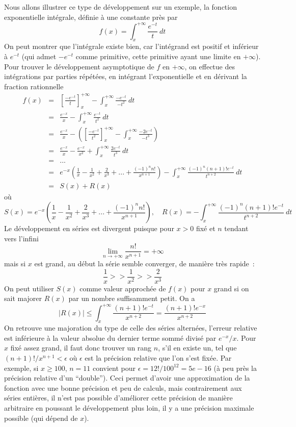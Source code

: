 \documentclass[a4paper,11pt]{article}
\begin{document}
Nous allons illustrer ce type de développement sur un exemple, la fonction 
exponentielle intégrale, définie à une constante près par
\[ f(x)=\int_x^{+\infty} \frac{e^{-t}}{t} \ dt \]
On peut montrer que l'intégrale existe bien, car l'intégrand est positif et inférieur à $e^{-t}$
(qui admet $-e^{-t}$ comme primitive, cette primitive ayant une limite en $+\infty$).
Pour trouver le développement asymptotique de $f$ en $+\infty$, on effectue des intégrations
par parties répétées, en intégrant l'exponentielle et en dérivant la fraction rationnelle
\begin{eqnarray*}
 f(x)&=&[\frac{-e^{-t}}{t}]_x^{+\infty} - \int_x^{+\infty} \frac{-e^{-t}}{-t^2} \ dt \\
&=& \frac{e^{-x}}{x} - \int_x^{+\infty} \frac{e^{-t}}{t^2} \ dt \\
&=& \frac{e^{-x}}{x} - ([\frac{-e^{-t}}{t^2}]_x^{+\infty} - \int_x^{+\infty} \frac{-2e^{-t}}{-t^3}) \\
&=& \frac{e^{-x}}{x} - \frac{e^{-x}}{x^2} + \int_x^{+\infty} \frac{2e^{-t}}{t^3} \ dt \\
&=& ... \\
&=& e^{-x}\left(\frac{1}{x} - \frac{1}{x^2} + \frac{2}{x^3} + ... + \frac{(-1)^n n!}{x^{n+1}}\right)
- \int_x^{+\infty} \frac{(-1)^n (n+1)!e^{-t}}{t^{n+2}} \ dt \\
&=& S(x) + R(x)
\end{eqnarray*}
où
\begin{equation} \label{eq:Eiinf}
 S(x)=e^{-x}
\left(\frac{1}{x} - \frac{1}{x^2} + \frac{2}{x^3} + ... + \frac{(-1)^n n!}{x^{n+1}}\right), 
\quad R(x)=- \int_x^{+\infty} \frac{(-1)^n (n+1)!e^{-t}}{t^{n+2}} \ dt 
\end{equation}
Le développement en séries est divergent puisque pour $x>0$ fixé et $n$ tendant vers l'infini
\[ \lim_{n\rightarrow +\infty} \frac{n!}{x^{n+1}} = +\infty\]
mais si $x$ est grand, au début la série semble converger, de manière très rapide~:
\[ \frac{1}{x} >> \frac{1}{x^2} >> \frac{2}{x^3} \]
On peut utiliser $S(x)$ comme valeur approchée de $f(x)$ pour $x$ grand si on sait majorer
$R(x)$ par un nombre suffisamment petit. On a
\[ | R(x) | \leq \int_x^{+\infty} \frac{(n+1)!e^{-t}}{x^{n+2}}
= \frac{(n+1)!e^{-x}}{x^{n+2}} \]
On retrouve une majoration du type de celle des séries alternées, 
l'erreur relative est inférieure
à la valeur absolue du dernier terme sommé divis\'e par $e^{-x}/x$. 
Pour $x$ fixé assez grand, il 
faut donc trouver un rang $n$, s'il en existe un, 
tel que $(n+1)!/x^{n+1}<\epsilon$ où
$\epsilon$ est la précision relative que l'on s'est fixée.
Par exemple, si $x\geq 100$, $n=11$ convient pour 
$\epsilon=12!/100^{12}=5e-16$ (à peu près
la précision relative d'un ``double'').
Ceci permet d'avoir une approximation de la fonction avec une bonne
pr\'ecision et peu de calculs, mais contrairement aux s\'eries enti\`eres,
il n'est pas possible d'am\'eliorer cette pr\'ecision de mani\`ere
arbitraire en poussant le d\'eveloppement plus loin, il y a une
pr\'ecision maximale possible (qui d\'epend de $x$).
\end{document}
